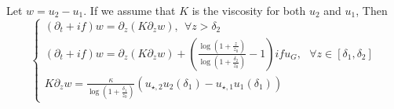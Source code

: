 Let $w=u_2 - u_1$. If we assume that $K$ is the viscosity for both
$u_2$ and $u_1$,
Then
\begin{equation}
	\begin{cases}
		(\partial_t + if) w = \partial_z (K \partial_z w) ,
		~~ \forall z > \delta_2 \\
(\partial_t + if) w = \partial_z (K \partial_z w) + \left(\frac{\log(1+\frac{z}{z_0})}
{\log(1+\frac{\delta_2}{z_0})} - 1\right)i f u_G 
, ~~~\forall z \in [\delta_1, \delta_2] \\
		K \partial_z w = \frac{\kappa}
		{\log(1+\frac{\delta_1}{z_0})}\left(
		u_{\star, 2} u_2(\delta_1) -
		u_{\star, 1} u_1(\delta_1)\right)
	\end{cases}
\end{equation}
